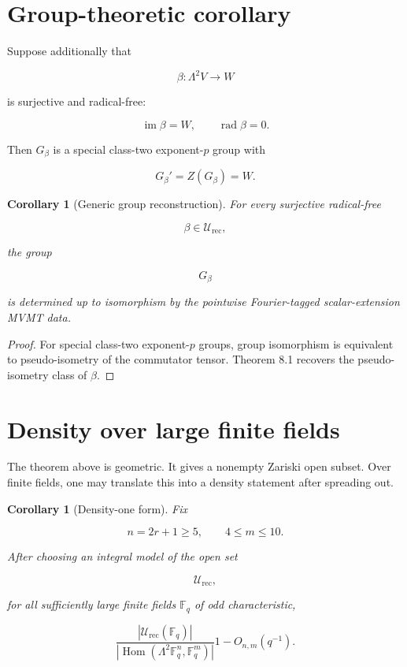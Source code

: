 \documentclass[11pt]{article}
\newtheorem{corollary}[theorem]{Corollary}
\begin{document}
\section{Group-theoretic corollary}

Suppose additionally that

\[
\beta:\Lambda^2V\to W
\]

is surjective and radical-free:

\[
\operatorname{im}\beta=W,
\qquad
\operatorname{rad}\beta=0.
\]

Then $G_\beta$ is a special class-two exponent-$p$ group with

\[
G_\beta'=Z(G_\beta)=W.
\]

\begin{corollary}[Generic group reconstruction]

For every surjective radical-free

\[
\beta\in\mathcal U_{\mathrm{rec}},
\]

the group

\[
G_\beta
\]

is determined up to isomorphism by the pointwise Fourier-tagged scalar-extension MVMT data.

\end{corollary}

\begin{proof}

For special class-two exponent-$p$ groups, group isomorphism is equivalent to pseudo-isometry of the commutator tensor. Theorem 8.1 recovers the pseudo-isometry class of $\beta$.

\end{proof}

\section{Density over large finite fields}

The theorem above is geometric. It gives a nonempty Zariski open subset. Over finite fields, one may translate this into a density statement after spreading out.

\begin{corollary}[Density-one form]

Fix

\[
n=2r+1\ge5,
\qquad
4\le m\le10.
\]

After choosing an integral model of the open set

\[
\mathcal U_{\mathrm{rec}},
\]

for all sufficiently large finite fields $\mathbb F_q$ of odd characteristic,

\[
\frac{
|\mathcal U_{\mathrm{rec}}(\mathbb F_q)|
}{
|\operatorname{Hom}(\Lambda^2\mathbb F_q^n,\mathbb F_q^m)|
}
1-O_{n,m}(q^{-1}).
\]

\end{corollary}
\end{document}
